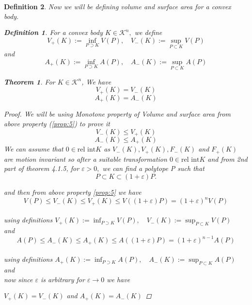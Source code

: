 \documentclass[oneside]{book}
\newtheorem{theorem}{Theorem}[section]
\newtheorem{mydef}{Definition}
\begin{document}
\begin{mydef}
Now we will be defining volume and surface area for a convex body.\\
 \begin{mydef} \label{d:15}
  For a convex body $K \in \mathcal{K}^{n},$ we define
$$ V_{+}(K):=\inf _{P \supset K} V(P), \quad V_{-}(K):=\sup _{P \subset K} V(P)$$ 
and
$$ A_{+}(K):=\inf _{P \supset K} A(P), \quad A_{-}(K):=\sup _{P \subset K} A(P) $$ 
 \end{mydef}
 
\begin{theorem} 	
\label{t:9}
For $K \in \mathcal{K}^{n}$, We have 
\begin{equation}
\label{eq46}
 V_{+}(K)=V_{-}(K)
\end{equation}
   \begin{equation}
   \label{eq47}
   A_{+}(K)=A_{-}(K)
   \end{equation}
\end{theorem}         
\begin{proof}
We will be using Monotone property of Volume and surface area from above property (\ref{prop:5}) to prove it \\
$$V_{-}(K) \leq V_{+}(K)  $$  $$ A_{-}(K) \leq A_{+}(K)$$
We can assume that $0 \in \text{rel int} K$ as  $V_{-}(K), V_{+}(K), F_{-}(K)$ and $F_{+}(K)$ are \newline motion invariant so after a suitable transformation
 $0 \in \text{rel int} K$ 
 and from 2nd part of theorem 4.1.5,
for $\varepsilon>0,$ we can find a polytope P such that 
$$P \subset K \subset(1+\varepsilon) P .$$

and then from above property \ref{prop:5} we have \\ 
\[
V(P) \leq V_{-}(K) \leq V_{+}(K) \leq V((1+\varepsilon) P)=(1+\varepsilon)^{n} V(P)
\] \\
using definitions $ V_{+}(K):=\inf _{P \supset K} V(P), \quad V_{-}(K):=\sup _{P \subset K} V(P)$ \\
and   \\
\[
A(P) \leq A_{-}(K) \leq A_{+}(K) \leq A((1+\varepsilon) P)=(1+\varepsilon)^{n-1} A(P)
\]  \\using definitions 
$ A_{+}(K):=\inf _{P \supset K} A(P), \quad A_{-}(K):=\sup _{P \subset K} A(P) $
 and \\ 
 
 now since $\varepsilon $ is arbitrary for $\varepsilon \rightarrow 0$ we have 
 
 $V_{+}(K)=V_{-}(K)$ and  $A_{+}(K)=A_{-}(K)$
 \end{proof}
 

\end{mydef}
\end{document}
